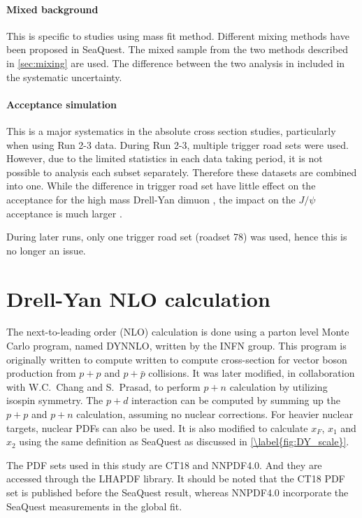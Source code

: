 \documentclass[../main.tex]{subfiles}
\begin{document}
\paragraph{Mixed background}
This is specific to studies using mass fit method. Different mixing methods have been proposed in SeaQuest.
The mixed sample from the two methods described in \cref{sec:mixing} are used. The difference between 
the two analysis in included in the systematic uncertainty.

\paragraph{Acceptance simulation}
This is a major systematics in the absolute cross section studies, particularly when using
Run 2-3 data.
During Run 2-3, multiple trigger road sets were used. However, due to the limited statistics in each
data taking period, it is not possible to analysis each subset separately. Therefore these datasets
are combined into one. While the difference in trigger road set have little effect on the acceptance
for the high mass Drell-Yan dimuon \cite{jdove-8168}, the impact on the $J/\psi$ acceptance is much
larger \cite{chleung-9643}.

During later runs, only one trigger road set (roadset 78) was used, hence this is no
longer an issue.



\section{Drell-Yan NLO calculation}
The next-to-leading order (NLO) calculation is done using a parton level Monte
Carlo program, named DYNNLO, written by the INFN group\cite{catani2009,catani2007}. This program
is originally written to compute written to compute cross-section for vector boson
production from $p+p$ and $p+\bar{p}$ collisions. It was later modified, in
collaboration with W.C.~Chang and S.~Prasad, to perform $p+n$ calculation
by utilizing isospin symmetry. The $p+d$ interaction can be computed by summing up
the $p+p$ and $p+n$ calculation, assuming no nuclear corrections. For heavier nuclear
targets, nuclear PDFs can also be used. It is also modified to calculate $x_F$, $x_1$ and $x_2$
using the same definition as SeaQuest as discussed in \cref{\label{fig:DY_scale}}.

The PDF sets used in this study are CT18\cite{hou2021} and NNPDF4.0\cite{ball2021}.
And they are accessed through the LHAPDF library\cite{buckley2015}. It should be noted
that the CT18 PDF set is published before the SeaQuest result, whereas NNPDF4.0
incorporate the SeaQuest measurements\cite{dove2021} in the global fit.
\end{document}
